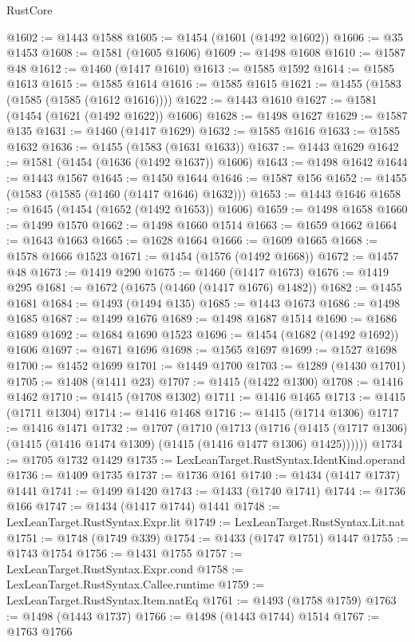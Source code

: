 \begin{lexlean}{RustCore}
\begin{coremodule}
@1602 := @1443 @1588
@1605 := @1454 (@1601 (@1492 @1602))
@1606 := @35 @1453
@1608 := @1581 (@1605 @1606)
@1609 := @1498 @1608
@1610 := @1587 @48
@1612 := @1460 (@1417 @1610)
@1613 := @1585 @1592
@1614 := @1585 @1613
@1615 := @1585 @1614
@1616 := @1585 @1615
@1621 := @1455 (@1583 (@1585 (@1585 (@1612 @1616))))
@1622 := @1443 @1610
@1627 := @1581 (@1454 (@1621 (@1492 @1622)) @1606)
@1628 := @1498 @1627
@1629 := @1587 @135
@1631 := @1460 (@1417 @1629)
@1632 := @1585 @1616
@1633 := @1585 @1632
@1636 := @1455 (@1583 (@1631 @1633))
@1637 := @1443 @1629
@1642 := @1581 (@1454 (@1636 (@1492 @1637)) @1606)
@1643 := @1498 @1642
@1644 := @1443 @1567
@1645 := @1450 @1644
@1646 := @1587 @156
@1652 := @1455 (@1583 (@1585 (@1460 (@1417 @1646) @1632)))
@1653 := @1443 @1646
@1658 := @1645 (@1454 (@1652 (@1492 @1653)) @1606)
@1659 := @1498 @1658
@1660 := @1499 @1570
@1662 := @1498 @1660 @1514
@1663 := @1659 @1662
@1664 := @1643 @1663
@1665 := @1628 @1664
@1666 := @1609 @1665
@1668 := @1578 @1666 @1523
@1671 := @1454 (@1576 (@1492 @1668))
@1672 := @1457 @48
@1673 := @1419 @290
@1675 := @1460 (@1417 @1673)
@1676 := @1419 @295
@1681 := @1672 (@1675 (@1460 (@1417 @1676) @1482))
@1682 := @1455 @1681
@1684 := @1493 (@1494 @135)
@1685 := @1443 @1673
@1686 := @1498 @1685
@1687 := @1499 @1676
@1689 := @1498 @1687 @1514
@1690 := @1686 @1689
@1692 := @1684 @1690 @1523
@1696 := @1454 (@1682 (@1492 @1692)) @1606
@1697 := @1671 @1696
@1698 := @1565 @1697
@1699 := @1527 @1698
@1700 := @1452 @1699
@1701 := @1449 @1700
@1703 := @1289 (@1430 @1701)
@1705 := @1408 (@1411 @23)
@1707 := @1415 (@1422 @1300)
@1708 := @1416 @1462
@1710 := @1415 (@1708 @1302)
@1711 := @1416 @1465
@1713 := @1415 (@1711 @1304)
@1714 := @1416 @1468
@1716 := @1415 (@1714 @1306)
@1717 := @1416 @1471
@1732 := @1707
    (@1710
      (@1713
        (@1716
          (@1415 (@1717 @1306) (@1415 (@1416 @1474 @1309) (@1415 (@1416 @1477 @1306) @1425))))))
@1734 := @1705 @1732 @1429
@1735 := LexLeanTarget.RustSyntax.IdentKind.operand
@1736 := @1409 @1735
@1737 := @1736 @161
@1740 := @1434 (@1417 @1737) @1441
@1741 := @1499 @1420
@1743 := @1433 (@1740 @1741)
@1744 := @1736 @166
@1747 := @1434 (@1417 @1744) @1441
@1748 := LexLeanTarget.RustSyntax.Expr.lit
@1749 := LexLeanTarget.RustSyntax.Lit.nat
@1751 := @1748 (@1749 @339)
@1754 := @1433 (@1747 @1751) @1447
@1755 := @1743 @1754
@1756 := @1431 @1755
@1757 := LexLeanTarget.RustSyntax.Expr.cond
@1758 := LexLeanTarget.RustSyntax.Callee.runtime
@1759 := LexLeanTarget.RustSyntax.Item.natEq
@1761 := @1493 (@1758 @1759)
@1763 := @1498 (@1443 @1737)
@1766 := @1498 (@1443 @1744) @1514
@1767 := @1763 @1766

\end{coremodule}
\end{lexlean}
